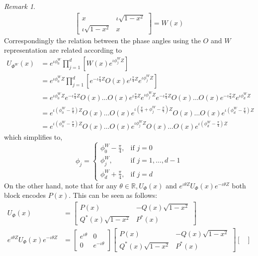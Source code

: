 \documentclass[12pt, oneside]{book}
\theoremstyle{definition}
\theoremstyle{definition}
\theoremstyle{remark}
\newtheorem*{remark}{Remark}
\begin{document}
\begin{remark}
\begin{align*}
\begin{bmatrix}
        x & \iota \sqrt{1-x^2}\\
        \iota \sqrt{1-x^2} & x
    \end{bmatrix}=W(x)
    \end{align*}
    Correspondingly the relation between the phase angles using the $O$ and $W$ representation are related according to
    \begin{align*}
    U_{\Phi^W}(x)&=e^{\iota \phi_0^W}\prod_{j=1}^d [W(x)e^{\iota\phi_j^WZ}]\\
    &=e^{\iota \phi_0^WZ}\prod_{j=1}^d [e^{-\iota \frac{\pi}{4}Z}O(x)e^{\iota \frac{\pi}{4}Z}e^{\iota \phi_j^WZ}]\\
    &=e^{\iota \phi_0^WZ}e^{-\iota \frac{\pi}{4}Z}O(x)\ldots O(x)e^{\iota \frac{\pi}{4}Z}e^{\iota \phi_j^WZ}e^{-\iota \frac{\pi}{4}Z}O(x)\ldots O(x)e^{-\iota \frac{\pi}{4}Z}e^{\iota \phi_d^WZ}\\
    &=e^{\iota (\phi_0^W-\frac{\pi}{4})Z}O(x)\ldots  O(x)e^{\iota (\frac{\pi}{4}+\phi_j^W -\frac{\pi}{4})Z}O(x)\ldots O(x)e^{\iota (\phi_d^W-\frac{\pi}{4})Z}\\
    &=e^{\iota (\phi_0^W-\frac{\pi}{4})Z}O(x)\ldots O(x)e^{\iota \phi_j^WZ}O(x)\ldots O(x)e^{\iota (\phi_d^W-\frac{\pi}{4})Z}
    \end{align*}
    which simplifies to,
    \[
\phi_j = 
\begin{cases} 
\phi_0^W - \frac{\pi}{4}, & \text{if } j = 0 \\ 
\phi_j^W, & \text{if } j = 1, \ldots, d - 1 \\ 
\phi_d^W + \frac{\pi}{4}, & \text{if } j = d 
\end{cases}
\]
On the other hand, note that for any $\theta \in \mathbb{R}, U_{\Phi}(x)$ and $e^{\iota \theta Z}U_{\Phi}(x)e^{-\iota \theta Z}$ both block encodes $P(x)$. This can be seen as follows:
\begin{align*}
U_{\Phi}(x) &= \begin{bmatrix}
    P(x) & -Q(x)\sqrt{1-x^2}\\
    Q^*(x)\sqrt{1-x^2} & P^*(x)
\end{bmatrix}\\
e^{\iota \theta Z}U_{\Phi}(x)e^{-\iota \theta Z} 
&=\begin{bmatrix}
    e^{\iota \theta} & 0 \\
    0 & e^{-\iota \theta}
\end{bmatrix} \begin{bmatrix}
    P(x) & -Q(x)\sqrt{1-x^2}\\
    Q^*(x)\sqrt{1-x^2} & P^*(x)
\end{bmatrix}\begin{bmatrix}

\end{bmatrix}
\end{align*}
\end{remark}
\end{document}

